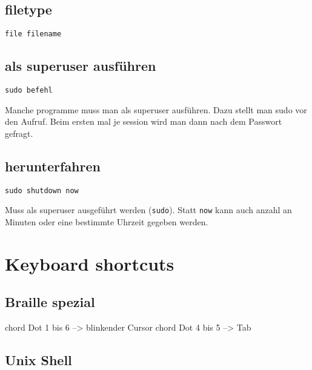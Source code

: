 \documentclass[]{book}
\begin{document}
\hypertarget{filetype}{%
\section{filetype}\label{filetype}}

\begin{verbatim}
file filename
\end{verbatim}

\hypertarget{als-superuser-ausfuhren}{%
\section{als superuser ausführen}\label{als-superuser-ausfuhren}}

\begin{verbatim}
sudo befehl
\end{verbatim}

Manche programme muss man als superuser ausführen. Dazu stellt man sudo vor den Aufruf. Beim ersten mal je session wird man dann nach dem Passwort gefragt.

\hypertarget{herunterfahren}{%
\section{herunterfahren}\label{herunterfahren}}

\begin{verbatim}
sudo shutdown now
\end{verbatim}

Muss als superuser ausgeführt werden (\texttt{sudo}). Statt \texttt{now} kann auch anzahl an Minuten oder eine bestimmte Uhrzeit gegeben werden.

\hypertarget{keyboard-shortcuts}{%
\chapter{Keyboard shortcuts}\label{keyboard-shortcuts}}

\hypertarget{braille-spezial}{%
\section{Braille spezial}\label{braille-spezial}}

chord Dot 1 bis 6 --\textgreater{} blinkender Cursor
chord Dot 4 bis 5 --\textgreater{} Tab

\hypertarget{unix-shell}{%
\section{Unix Shell}\label{unix-shell}}
\end{document}
